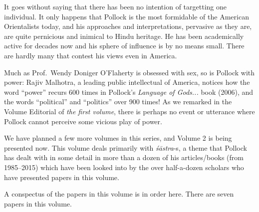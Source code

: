 It goes without saying that there has been no intention of targetting one individual. It only happens that Pollock is the most formidable of the American Orientalists today, and his approaches and interpretations, pervasive as they are, are quite pernicious and inimical to Hindu heritage. He has been academically active for decades now and his sphere of influence is by no means small. There are hardly many that contest his views even in America. 
\eject

Much as Prof.~Wendy Doniger O’Flaherty is obsessed with sex, so is Pollock with power: Rajiv Malhotra, a leading public intellectual of America, notices how the word “power” recurs 600 times in Pollock’s {\sl Language of Gods...} book (2006), and the words “political” and “politics” over 900 times! As we remarked in the Volume Editorial of {\sl the first volume}, there is perhaps no event or utterance where Pollock cannot perceive some vicious play of power.

We have planned a few more volumes in this series, and Volume 2 is being presented now. This volume deals primarily with {\sl śāstra}-s, a theme that Pollock has dealt with in some detail in more than a dozen of his articles/books (from 1985--2015) which have been looked into by the over half-a-dozen scholars who have presented papers in this volume.
\vskip 8pt

A conspectus of the papers in this volume is in order here. There are seven papers in this volume.

